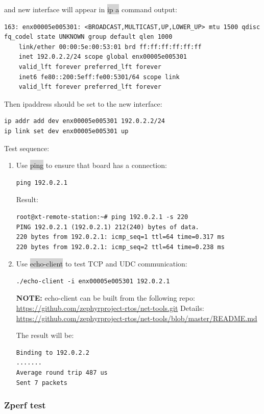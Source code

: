 \documentclass[11pt,a4paper,oneside]{article}
\begin{document}
and new interface will appear in \colorbox{lightgray}{ip a} command output:
\begin{lstlisting}
163: enx00005e005301: <BROADCAST,MULTICAST,UP,LOWER_UP> mtu 1500 qdisc fq_codel state UNKNOWN group default qlen 1000
	link/ether 00:00:5e:00:53:01 brd ff:ff:ff:ff:ff:ff
	inet 192.0.2.2/24 scope global enx00005e005301
	valid_lft forever preferred_lft forever
	inet6 fe80::200:5eff:fe00:5301/64 scope link
	valid_lft forever preferred_lft forever
\end{lstlisting}

Then ipaddress should be set to the new interface:
\begin{lstlisting}
ip addr add dev enx00005e005301 192.0.2.2/24
ip link set dev enx00005e005301 up
\end{lstlisting}

Test sequence:

\begin{enumerate}
	\def\labelenumi{\arabic{enumi}.}
	\item
	Use \colorbox{lightgray}{ping} to ensure that board has a connection:
\begin{lstlisting}
ping 192.0.2.1
\end{lstlisting}
	Result:
\begin{lstlisting}
root@xt-remote-station:~# ping 192.0.2.1 -s 220
PING 192.0.2.1 (192.0.2.1) 212(240) bytes of data.
220 bytes from 192.0.2.1: icmp_seq=1 ttl=64 time=0.317 ms
220 bytes from 192.0.2.1: icmp_seq=2 ttl=64 time=0.238 ms
\end{lstlisting}
	\item
	Use \colorbox{lightgray}{echo-client} to test TCP and UDC communication:
\begin{lstlisting}
./echo-client -i enx00005e005301 192.0.2.1
\end{lstlisting}

	\textbf{NOTE:} echo-client can be built from the following repo:
	\url{https://github.com/zephyrproject-rtos/net-tools.git}
	Details:
	\url{https://github.com/zephyrproject-rtos/net-tools/blob/master/README.md}

	The result will be:
\begin{lstlisting}
Binding to 192.0.2.2
.......
Average round trip 487 us
Sent 7 packets
\end{lstlisting}

\end{enumerate}

\subsubsection{Zperf test}\label{zperf-usb}
\end{document}
